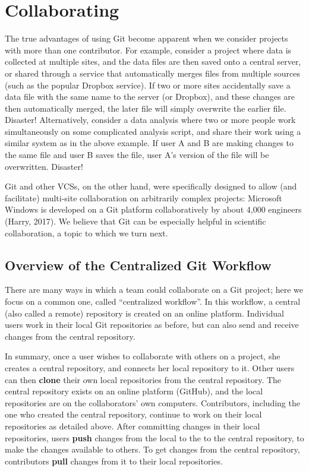 \documentclass[
  american,
  ,doc,floatsintext]{apa6}
\begin{document}
\hypertarget{collaborating}{%
\section{Collaborating}\label{collaborating}}

The true advantages of using Git become apparent when we consider projects with more than one contributor. For example, consider a project where data is collected at multiple sites, and the data files are then saved onto a central server, or shared through a service that automatically merges files from multiple sources (such as the popular Dropbox service). If two or more sites accidentally save a data file with the same name to the server (or Dropbox), and these changes are then automatically merged, the later file will simply overwrite the earlier file. Disaster! Alternatively, consider a data analysis where two or more people work simultaneously on some complicated analysis script, and share their work using a similar system as in the above example. If user A and B are making changes to the same file and user B saves the file, user A's version of the file will be overwritten. Disaster!

Git and other VCSs, on the other hand, were specifically designed to allow (and facilitate) multi-site collaboration on arbitrarily complex projects: Microsoft Windows is developed on a Git platform collaboratively by about 4,000 engineers (Harry, 2017). We believe that Git can be especially helpful in scientific collaboration, a topic to which we turn next.

\hypertarget{overview-of-the-centralized-git-workflow}{%
\subsection{Overview of the Centralized Git Workflow}\label{overview-of-the-centralized-git-workflow}}

There are many ways in which a team could collaborate on a Git project; here we focus on a common one, called \enquote{centralized workflow}. In this workflow, a central (also called a remote) repository is created on an online platform. Individual users work in their local Git repositories as before, but can also send and receive changes from the central repository.

In summary, once a user wishes to collaborate with others on a project, she creates a central repository, and connects her local repository to it. Other users can then \textbf{clone} their own local repositories from the central repository. The central repository exists on an online platform (GitHub), and the local repositories are on the collaborators' own computers. Contributors, including the one who created the central repository, continue to work on their local repositories as detailed above. After committing changes in their local repositories, users \textbf{push} changes from the local to the to the central repository, to make the changes available to others. To get changes from the central repository, contributors \textbf{pull} changes from it to their local repositories.
\end{document}
